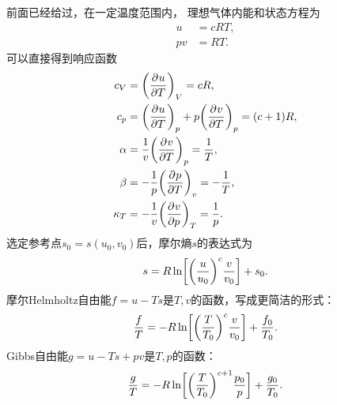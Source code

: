 前面已经给过，在一定温度范围内，
理想气体内能和状态方程为
\begin{subequations}
	\begin{align}
		u&=cRT,\\
		pv&=RT.
	\end{align}
\end{subequations}
可以直接得到响应函数
\begin{subequations}
	\begin{align}
		c_V&=\pu[V]uT=cR,\\
		c_p&=\pu[p]uT+p\pu[p]vT=(c+1)R,\\
		\alpha&=\frac1v\pu[p]vT=\frac1T,\\
		\beta&=-\frac1p\pu[v]pT=-\frac1T,\\
		\kappa_T&=-\frac1v\pu[T]vp=\frac1p.
	\end{align}
\end{subequations}
选定参考点$s_0=s(u_0,v_0)$后，摩尔熵$s$的表达式为
\begin{equation}
	s=R\ln\biggfkh{\biggkh{\frac u{u_0}}^c\frac v{v_0}}+s_0.
\end{equation}
摩尔Helmholtz自由能$f=u-Ts$是$T,v$的函数，写成更简洁的形式：
\begin{equation}
	\frac fT=-R\ln\biggfkh{\biggkh{\frac T{T_0}}^c\frac v{v_0}}+\frac{f_0}{T_0}.
\end{equation}
Gibbs自由能$g=u-Ts+pv$是$T,p$的函数：
\begin{equation}
	\frac gT=-R\ln\biggfkh{\biggkh{\frac T{T_0}}^{c+1}\frac{p_0}p}+\frac{g_0}{T_0}.
\end{equation}



